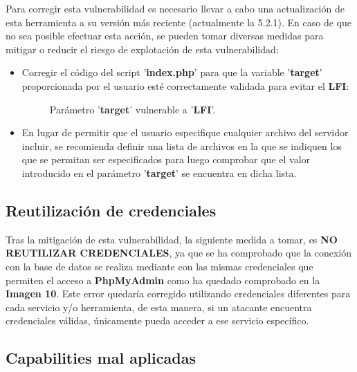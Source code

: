 \documentclass[a4paper]{article} %
\begin{document}
  Para corregir esta vulnerabilidad es necesario llevar a cabo una actualización de esta herramienta a su versión más reciente (actualmente la 5.2.1). En caso de que no sea posible efectuar esta acción, se pueden tomar diversas medidas para mitigar o reducir el riesgo de explotación de esta vulnerabilidad:

  \begin{itemize}
    \item Corregir el código del script '\textbf{index.php}' para que la variable '\textbf{target}' proporcionada por el usuario esté correctamente validada para evitar el \textbf{LFI}:
    \begin{figure}[h]
      \centering
      \setlength{\fboxrule}{0.8pt}
      \caption{Parámetro '\textbf{target}' vulnerable a '\textbf{LFI}'.}
   \end{figure}
  \end{itemize}

  \begin{itemize}
    \item En lugar de permitir que el usuario especifique cualquier archivo del servidor incluir, se recomienda definir una lista de archivos en la que se indiquen los que se permitan ser especificados para luego comprobar que el valor introducido en el parámetro '\textbf{target}' se encuentra en dicha lista.
  \end{itemize}

    \subsection{Reutilización de credenciales}

  Tras la mitigación de esta vulnerabilidad, la siguiente medida a tomar, es \textbf{NO REUTILIZAR CREDENCIALES}, ya que se ha comprobado que la conexión con la base de datos se realiza mediante con las mismas credenciales que permiten el acceso a \textbf{PhpMyAdmin} como ha quedado comprobado en la \textbf{Imagen 10}. Este error quedaría corregido utilizando credenciales diferentes para cada servicio y/o herramienta, de esta manera, si un atacante encuentra credenciales válidas, únicamente pueda acceder a ese servicio específico.

  \clearpage

    \subsection{Capabilities mal aplicadas}
\end{document}
